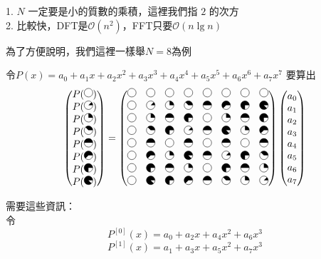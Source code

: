 1. $N$ 一定要是小的質數的乘積，這裡我們指 $2$ 的次方\\
2. 比較快，DFT是$\mathcal{O}(n^2)$，FFT只要$\mathcal{O}(n\lg n)$

為了方便說明，我們這裡一樣舉$N=8$為例

令$P(x)=a_0+a_1x+a_2x^2+a_3x^3+a_4x^4+a_5x^5+a_6x^6+a_7x^7$
要算出
\[
\begin{pmatrix}    
P(\pie{0})\\
P(\pie{45})\\
P(\pie{90})\\
P(\pie{135})\\
P(\pie{180})\\
P(\pie{225})\\
P(\pie{270})\\
P(\pie{315})
\end{pmatrix} 
=
\begin{pmatrix}    
\pie{0} & \pie{0} & \pie{0} & \pie{0} & \pie{0} & \pie{0} &\pie{0} & \pie{0}\\     
\pie{0} & \pie{45} & \pie{90} & \pie{135} & \pie{180} & \pie{225} &\pie{270} & \pie{315}\\     
\pie{0} & \pie{90} & \pie{180} & \pie{270} &\pie{0} & \pie{90} & \pie{180} & \pie{270}\\     
\pie{0} & \pie{135} & \pie{270} & \pie{45} & \pie{180} & \pie{315} &\pie{90} & \pie{225}\\    
\pie{0} & \pie{180} & \pie{0} & \pie{180} & \pie{0} & \pie{180} &\pie{0} & \pie{180}\\    
\pie{0} & \pie{225} & \pie{90} & \pie{315} & \pie{180} & \pie{45} &\pie{270} & \pie{135}\\
\pie{0} & \pie{270} & \pie{180} & \pie{90} & \pie{0} & \pie{270} &\pie{180} & \pie{90}\\     
\pie{0} & \pie{315} & \pie{270} & \pie{225} & \pie{180} & \pie{135} &\pie{90} & \pie{45}  
\end{pmatrix}
\begin{pmatrix}    
a_0\\
a_1\\
a_2\\
a_3\\
a_4\\
a_5\\
a_6\\
a_7
\end{pmatrix}
\]



需要這些資訊：\\
令
$$P^{[0]}(x)=a_0+a_2x+a_4x^2+a_6x^3$$
$$P^{[1]}(x)=a_1+a_3x+a_5x^2+a_7x^3$$

